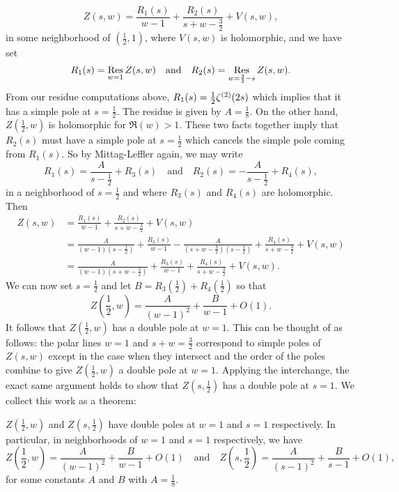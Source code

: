     \[
        Z(s,w) = \frac{R_{1}(s)}{w-1}+\frac{R_{2}(s)}{s+w-\frac{3}{2}}+V(s,w),
    \]
    in some neighborhood of $\left(\frac{1}{2},1\right)$, where $V(s,w)$ is holomorphic, and we have set
    \[
        R_{1}(s) = \operatorname*{\mathrm{Res}}_{w = 1}Z(s,w) \quad \text{and} \quad R_{2}(s) = \operatorname*{\mathrm{Res}}_{w = \frac{3}{2}-s}Z(s,w).
    \]
    From our residue computations above, $R_{1}(s) = \frac{1}{2}\zeta^{(2)}(2s)$ which implies that it has a simple pole at $s = \frac{1}{2}$. The residue is given by $A = \frac{1}{8}$. On the other hand, $Z\left(\frac{1}{2},w\right)$ is holomorphic for $\Re(w) > 1$. These two facts together imply that $R_{2}(s)$ must have a simple pole at $s = \frac{1}{2}$ which cancels the simple pole coming from $R_{1}(s)$. So by Mittag-Leffler again, we may write
    \[
        R_{1}(s) = \frac{A}{s-\frac{1}{2}}+R_{3}(s) \quad \text{and} \quad R_{2}(s) = -\frac{A}{s-\frac{1}{2}}+R_{4}(s),
    \]
    in a neighborhood of $s = \frac{1}{2}$ and where $R_{3}(s)$ and $R_{4}(s)$ are holomorphic. Then
    \begin{align*}
        Z(s,w) &= \frac{R_{1}(s)}{w-1}+\frac{R_{2}(s)}{s+w-\frac{3}{2}}+V(s,w) \\ 
        &= \frac{A}{(w-1)\left(s-\frac{1}{2}\right)}+\frac{R_{3}(s)}{w-1}-\frac{A}{\left(s+w-\frac{3}{2}\right)\left(s-\frac{1}{2}\right)}+\frac{R_{4}(s)}{s+w-\frac{3}{2}}+V(s,w) \\
        &= \frac{A}{(w-1)\left(s+w-\frac{3}{2}\right)}+\frac{R_{3}(s)}{w-1}+\frac{R_{4}(s)}{s+w-\frac{3}{2}}+V(s,w).
    \end{align*}
    We can now set $s = \frac{1}{2}$ and let $B = R_{3}\left(\frac{1}{2}\right)+R_{4}\left(\frac{1}{2}\right)$ so that
    \[
        Z\left(\frac{1}{2},w\right) = \frac{A}{(w-1)^{2}}+\frac{B}{w-1}+O(1).
    \]
    It follows that $Z\left(\frac{1}{2},w\right)$ has a double pole at $w = 1$. This can be thought of as follows: the polar lines $w = 1$ and $s+w = \frac{3}{2}$ correspond to simple poles of $Z(s,w)$ except in the case when they intersect and the order of the poles combine to give $Z\left(\frac{1}{2},w\right)$ a double pole at $w = 1$. Applying the interchange, the exact same argument holds to show that $Z\left(s,\frac{1}{2}\right)$ has a double pole at $s = 1$. We collect this work as a theorem:

    \begin{theorem}\label{NFthm:double_poles_at_1/2}
        $Z\left(\frac{1}{2},w\right)$ and $Z\left(s,\frac{1}{2}\right)$ have double poles at $w = 1$ and $s = 1$ respectively. In particular, in neighborhoods of $w = 1$ and $s = 1$ respectively, we have
        \[
            Z\left(\frac{1}{2},w\right) = \frac{A}{(w-1)^{2}}+\frac{B}{w-1}+O(1) \quad \text{and} \quad Z\left(s,\frac{1}{2}\right) = \frac{A}{(s-1)^{2}}+\frac{B}{s-1}+O(1),
        \]
        for some constants $A$ and $B$ with $A = \frac{1}{8}$. 
    \end{theorem}